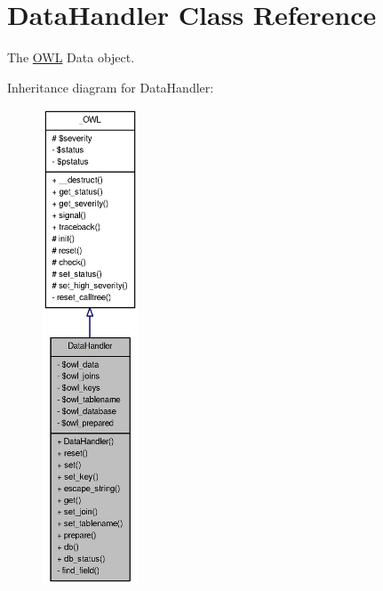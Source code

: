 \section{DataHandler Class Reference}
\label{classDataHandler}


The \hyperlink{classOWL}{OWL} Data object.  




Inheritance diagram for DataHandler:\nopagebreak
\begin{figure}[H]
\begin{center}
\leavevmode
\includegraphics[height=400pt]{classDataHandler__inherit__graph}
\end{center}
\end{figure}


